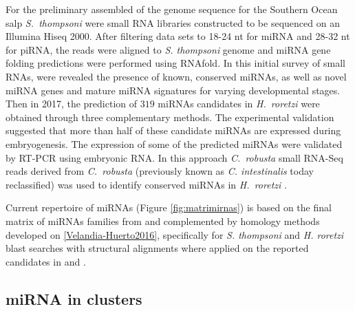 \documentclass[graybox]{svmult}
\newcommand{\TODO}[1]{\begingroup\color{red}#1\endgroup}
\begin{document}
For the preliminary assembled of the genome sequence for the Southern Ocean
salp \textit{S.\ thompsoni} \cite{Jue2016} were small RNA libraries
constructed to be sequenced on an Illumina Hiseq 2000. After filtering data
sets to 18-24 nt for miRNA and 28-32 nt for piRNA, the reads were aligned
to \textit{S. thompsoni} genome and miRNA gene folding predictions were
performed using RNAfold. In this initial survey of small RNAs, were
revealed the presence of known, conserved miRNAs, as well as novel miRNA
genes and mature miRNA signatures for varying developmental stages. Then in
2017, the prediction of $319$ miRNAs candidates in \textit{H.\ roretzi}
were obtained through three complementary methods. The experimental
validation suggested that more than half of these candidate miRNAs are
expressed during embryogenesis. The expression of some of the predicted
miRNAs were validated by RT-PCR using embryonic RNA. In this approach
\textit{C.\ robusta} small RNA-Seq reads derived from \textit{C.\ robusta}
\cite{Shi2009} (previously known as \textit{C. intestinalis} today
reclassified) was used to identify conserved miRNAs in \textit{H.\ roretzi}
\cite{Wang2017}.

Current repertoire of miRNAs (Figure \ref{fig:matrimirnas}) is based on the
final matrix of miRNAs families from \cite{Hertel:15a} and complemented by
homology methods developed on \ref{Velandia-Huerto2016}, specifically for
\textit{S. thompsoni} and \textit{H. roretzi} blast searches with
structural alignments where applied on the reported candidates in
\cite{Jue2016} and \cite{Wang2017}.


\subsection{miRNA in clusters}
\end{document}
